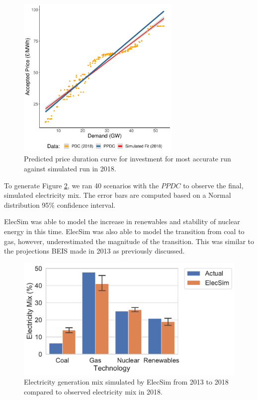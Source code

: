 \begin{figure}
	\centering
	\includegraphics[width=0.7\textwidth]{Chapter4/figures/e-Energy-2020/results/best_run_price_dur_curve.pdf}
	\caption{Predicted price duration curve for investment for most accurate run against simulated run in 2018.}
	\label{fig:best_price_curve}
\end{figure}



To generate Figure \ref{fig:uk_validated_results_2018}, we ran 40 scenarios with the $PPDC$ to observe the final, simulated electricity mix. The error bars are computed based on a Normal distribution 95\% confidence interval.

ElecSim was able to model the increase in renewables and stability of nuclear energy in this time. ElecSim was also able to model the transition from coal to gas, however, underestimated the magnitude of the transition. This was similar to the projections BEIS made in 2013 as previously discussed.

\begin{figure}
	\centering
	\includegraphics[width=\textwidth]{Chapter4/figures/e-Energy-2020/results/best_run_coal_dropout_95_ci.pdf}
	\caption{Electricity generation mix simulated by ElecSim from 2013 to 2018 compared to observed electricity mix in 2018.}
	\label{fig:uk_validated_results_2018}
\end{figure}


